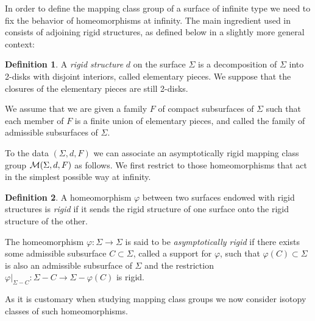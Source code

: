 \documentclass[twoside]{irmaems}
\theoremstyle{plain}
\theoremstyle{definition}
\newtheorem{definition}{Definition}[section]
\theoremstyle{remark}
\begin{document}
\vspace{0.2cm} 
\noindent 
In order to define the mapping class group of a surface of infinite type we need 
to fix the behavior of homeomorphisms at infinity. The main 
ingredient used in \cite{fu-ka2}  consists of adjoining rigid structures, 
as defined below in a slightly more general context: 

\begin{definition}
A {\em rigid structure} $d$  on the surface 
$\Sigma$ is a decomposition  of $\Sigma$ into 2-disks with disjoint 
interiors, called elementary pieces. We suppose that the closures 
of the elementary pieces are still 2-disks.  

\vspace{0.2cm}
\noindent
We assume that we are given a family $F$ of compact subsurfaces of $\Sigma$ 
such that each member of $F$ is a finite union of elementary pieces, 
and called the family of admissible subsurfaces of $\Sigma$. 
\end{definition}


\vspace{0.2cm}
\noindent
To the data $(\Sigma, d, F)$ we can associate an asymptotically rigid  
mapping class group  ${\cal M}(\Sigma, d, F)$ as follows. We first restrict to 
those homeomorphisms that act in the simplest possible way at infinity. 

\begin{definition}
A homeomorphism $\varphi$ between two surfaces endowed 
with rigid structures is {\em rigid} if it sends the rigid structure of one 
surface onto the rigid structure of the other. 

\vspace{0.2cm}
\noindent
The homeomorphism $\varphi:\Sigma\to \Sigma$ is  said to be 
{\em asymptotically rigid}  
if  there exists some admissible subsurface 
$C\subset \Sigma$, called a support for $\varphi$, 
such that $\varphi(C)\subset \Sigma$ is 
also an admissible subsurface of $\Sigma$ and  
the restriction $\varphi|_{\Sigma-C}:\Sigma-C\to \Sigma-\varphi(C)$ 
is rigid. 
\end{definition}



\vspace{0.2cm}
\noindent As it is customary when studying mapping class groups  
we now consider isotopy classes of such homeomorphisms. 
\end{document}

